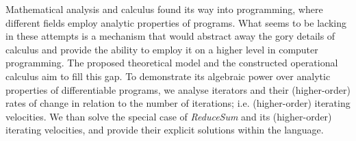 Mathematical analysis and calculus found its way into programming, where different fields employ analytic properties of programs. What seems to be lacking in these attempts is a mechanism that would abstract away the gory details of calculus and provide the ability to employ it on a higher level in computer programming. The proposed theoretical model and the constructed operational calculus aim to fill this gap. To demonstrate its algebraic power over analytic properties of differentiable programs, we analyse iterators and their (higher-order) rates of change in relation to the number of iterations; i.e. (higher-order) iterating velocities. We than solve the special case of \emph{ReduceSum} and its (higher-order) iterating velocities, and provide their explicit solutions within the language.










